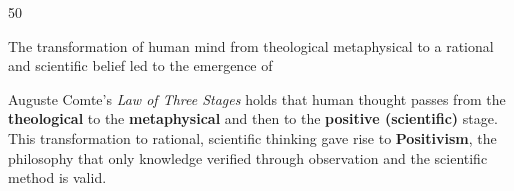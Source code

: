 \begin{question}{50}
{The transformation of human mind from theological metaphysical to a rational and scientific belief led to the emergence of\par}
\begin{explain}
Auguste Comte's \emph{Law of Three Stages} holds that human thought passes from the \textbf{theological} to the \textbf{metaphysical} and then to the \textbf{positive (scientific)} stage. This transformation to rational, scientific thinking gave rise to \textbf{Positivism}, the philosophy that only knowledge verified through observation and the scientific method is valid.
\end{explain}
\end{question}
